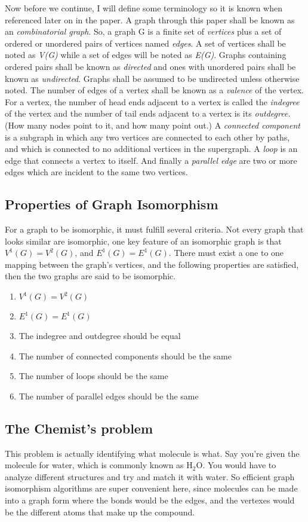 \documentclass[notitlepage]{report}
\begin{document}
Now before we continue, I will define some terminology so it is known when referenced later on in the paper. A graph through this paper shall be known as an \textit{combinatorial graph}. So, a graph G is a finite set of \textit{vertices} plus a set of ordered or unordered pairs of vertices named \textit{edges}. A set of vertices shall be noted as \textit{V(G)} while a set of edges will be noted as \textit{E(G)}. Graphs containing ordered pairs shall be known as \textit{directed} and ones with unordered pairs shall be known as \textit{undirected}. Graphs shall be assumed to be undirected unless otherwise noted. The number of edges of a vertex shall be known as a \textit{valence} of the vertex. For a vertex, the number of head ends adjacent to a vertex is called the \textit{indegree} of the vertex and the number of tail ends adjacent to a vertex is its \textit{outdegree}. (How many nodes point to it, and how many point out.) A \textit{connected component} is a subgraph in which any two vertices are connected to each other by paths, and which is connected to no additional vertices in the supergraph. A \textit{loop} is an edge that connects a vertex to itself. And finally a \textit{parallel edge} are two or more edges which are incident to the same two vertices.

\subsection*{Properties of Graph Isomorphism}
For a graph to be isomorphic, it must fulfill several criteria. Not every graph that looks similar are isomorphic, one key feature of an isomorphic graph is that $V^{1}(G) = V^{2}(G)$, and $E^{1}(G) = E^{1}(G)$. There must exist a one to one mapping between the graph's vertices, and the following properties are satisfied, then the two graphs are said to be isomorphic.

\begin{enumerate}
\item $V^{1}(G) = V^{2}(G)$
\item $E^{1}(G) = E^{1}(G)$
\item The indegree and outdegree should be equal
\item The number of connected components should be the same
\item The number of loops should be the same
\item The number of parallel edges should be the same
\end{enumerate}

\subsection*{The Chemist's problem}
This problem is actually identifying what molecule is what. Say you're given the molecule for water, which is commonly known as H$_{2}$O. You would have to analyze different structures and try and match it with water. So efficient graph isomorphism algorithms are super convenient here, since molecules can be made into a graph form where the bonds would be the edges, and the vertexes would be the different atoms that make up the compound.~\cite{miller}
\end{document}
